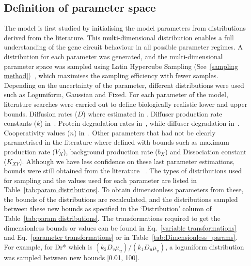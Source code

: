 \subsection{Definition of parameter space}
The model is first studied by initialising the model parameters from distributions derived from the literature.
This multi-dimensional distribution enables a full understanding of the gene circuit behaviour in all possible parameter regimes.
A distribution for each parameter was generated, and the multi-dimensional parameter space was sampled using Latin Hypercube Sampling (See~\ref{sampling method})~\parencite{Iman2014, Bergstra2012}, which maximises the sampling efficiency with fewer samples.
Depending on the uncertainty of the parameter, different distributions were used such as Loguniform, Gaussian and Fixed.
 For each parameter of the model, literature searches were carried out to define biologically realistic lower and upper bounds.
Diffusion rates ($D$) where estimated in .%
Diffuser production rate constants ($k$) in~\cite{Schaefer1996, Pai2009}.
Protein degradation rates in~\cite{Andersen1998}, while diffuser degradation in~\cite{kaufmann2005revisiting}.
Cooperativity values ($n$) in~\cite{Babic2007}.
Other parameters that had not be clearly parametrised in the literature where defined with bounds such as maximum production rate ($V_{X}$), background production rate ($b_{X}$) and Dissociation constant ($K_{XY}$). Although we have less confidence on these last parameter estimations, bounds were still obtained from the literature ~\parencite{Scholes2019, Pusnik2019}.
The types of distributions used for sampling and the values used for each parameter are listed in Table~\ref{tab:param distributions}.
To obtain dimensionless parameters from these, the bounds of the distributions are recalculated, and the distributions sampled between these new bounds as specified in the ‘Distribution’ column of Table~\ref{tab:param distributions}.
The transformations required to get the dimensionless bounds or values can be found in Eq.~\ref{variable transformations} and Eq.~\ref{parameter transformations} or in Table~\ref{tab:Dimensionless_params}.
For example, for Dr* which is $(k_{2}D_{v}\mu_{u})/(k_{1}D_{u}\mu_{v})$, a loguniform distribution was sampled between new bounds [0.01, 100].
